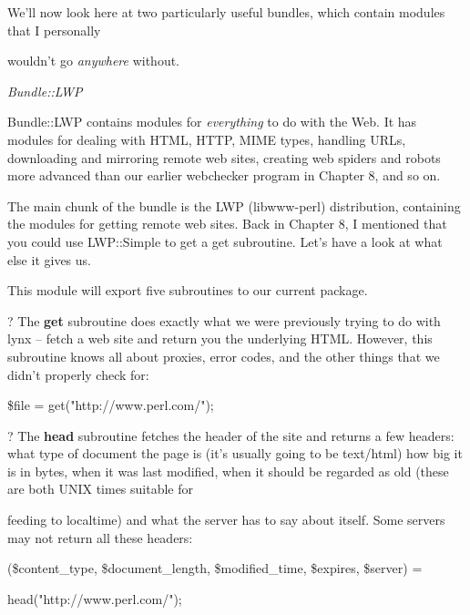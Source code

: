 \documentclass[a4paper,11pt]{book}
\begin{document}
\noindent 

\noindent We'll now look here at two particularly useful bundles, which contain modules that I personally

\noindent wouldn't go \textit{anywhere }without.

\noindent 

\noindent \textit{Bundle::LWP}

\noindent Bundle::LWP contains modules for \textit{everything }to do with the Web. It has modules for dealing with HTML, HTTP, MIME types, handling URLs, downloading and mirroring remote web sites, creating web spiders and robots more advanced than our earlier webchecker program in Chapter 8, and so on.

\noindent 

\noindent The main chunk of the bundle is the LWP (libwww-perl) distribution, containing the modules for getting remote web sites. Back in Chapter 8, I mentioned that you could use LWP::Simple to get a get subroutine. Let's have a look at what else it gives us.

\noindent 

\noindent This module will export five subroutines to our current package.

\noindent 

\noindent ? The \textbf{get }subroutine does exactly what we were previously trying to do with lynx -- fetch a web site and return you the underlying HTML. However, this subroutine knows all about proxies, error codes, and the other things that we didn't properly check for:

\noindent 

\noindent \$file = get("http://www.perl.com/");

\noindent 

\noindent ? The \textbf{head }subroutine fetches the header of the site and returns a few headers: what type of document the page is (it's usually going to be text/html) how big it is in bytes, when it was last modified, when it should be regarded as old (these are both UNIX times suitable for

\noindent feeding to localtime) and what the server has to say about itself. Some servers may not return all these headers:

\noindent 

\noindent (\$content\_type, \$document\_length, \$modified\_time, \$expires, \$server) =

\noindent head("http://www.perl.com/");
\end{document}
